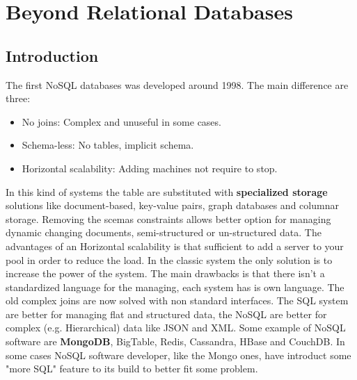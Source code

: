 \documentclass[12pt]{article}
\begin{document}
\newpage
\section{Beyond Relational Databases}
\subsection{Introduction}
The first NoSQL databases was developed around 1998. The main difference are three:
\begin{itemize}
  \item No joins: Complex and unuseful in some cases.
  \item Schema-less: No tables, implicit schema.
  \item Horizontal scalability: Adding machines not require to stop.
\end{itemize}
In this kind of systems the table are substituted with \textbf{specialized storage} solutions like document-based, key-value pairs, graph databases and columnar storage. Removing the scemas constraints allows better option for managing dynamic changing documents, semi-structured or un-structured data. The advantages of an Horizontal scalability is that sufficient to add a server to your pool in order to reduce the load. In the classic system the only solution is to increase the power of the system. The main drawbacks is that there isn't a standardized language for the managing, each system has is own language. The old complex joins are now solved with non standard interfaces. The SQL system are better for managing flat and structured data, the NoSQL are better for complex (e.g. Hierarchical) data like JSON and XML. Some example of NoSQL software are \textbf{MongoDB}, BigTable, Redis, Cassandra, HBase and CouchDB. In some cases NoSQL software developer, like the Mongo ones, have introduct some "more SQL" feature to its build to better fit some problem.
\end{document}
